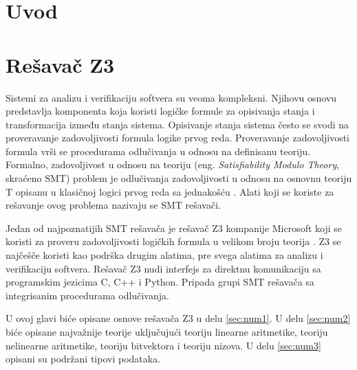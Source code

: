 \documentclass[12pt,oneside]{memoir}
\begin{document}
\frontmatter
\naslovna
\komisija
\apstrakt
\tableofcontents*

\mainmatter

\chapter{Uvod}


\chapter{Rešavač Z3}
\label{chp:razrada}

Sistemi za analizu i verifikaciju softvera su veoma kompleksni. Njihovu osnovu predstavlja komponenta koja koristi logičke formule za opisivanja stanja i transformacija između stanja sistema. Opisivanje stanja sistema često se svodi na proveravanje zadovoljivosti formula logike prvog reda. 
Proveravanje zadovoljivosti formula vrši se procedurama odlučivanja u odnosu na definisanu teoriju. Formalno, zadovoljivost u odnosu na teoriju (eng. \textit{Satisfiability Modulo Theory}, skraćeno SMT) problem je odlučivanja zadovoljivosti u odnosu na osnovnu teoriju T opisanu u klasičnoj logici prvog reda sa jednakošću \cite{Barrett}. Alati koji se koriste za rešavanje ovog problema nazivaju se SMT rešavači. 
\par

Jedan od najpoznatijih SMT rešavača je rešavač Z3 kompanije Microsoft koji se koristi za proveru zadovoljivosti logičkih formula u velikom broju teorija \cite{EfficientSMTSolver}. Z3 se najčešče koristi kao podrška drugim alatima, pre svega alatima za analizu i verifikaciju softvera. Rešavač Z3 nudi interfejs za direktnu komunikaciju sa programskim jezicima C, C++ i Python. Pripada grupi SMT rešavača sa integrisanim procedurama odlučivanja.
\par
U ovoj glavi biće opisane osnove rešavača Z3 u delu \ref{sec:num1}. U delu \ref{sec:num2} biće opisane najvažnije teorije uključujući teoriju linearne aritmetike, teoriju nelinearne aritmetike, teoriju bitvektora i teoriju nizova. U delu \ref{sec:num3} opisani su podržani tipovi podataka.  
\end{document}

